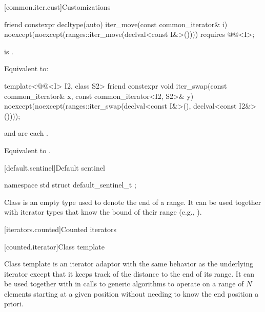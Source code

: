 [common.iter.cust]{Customizations}

%
\begin{itemdecl}
friend constexpr decltype(auto) iter_move(const common_iterator& i)
  noexcept(noexcept(ranges::iter_move(declval<const I&>())))
    requires @@<I>;
\end{itemdecl}

\begin{itemdescr}
\pnum
\hardexpects
{} is .

\pnum
\effects
Equivalent to: 
\end{itemdescr}

%
\begin{itemdecl}
template<@@<I> I2, class S2>
  friend constexpr void iter_swap(const common_iterator& x, const common_iterator<I2, S2>& y)
    noexcept(noexcept(ranges::iter_swap(declval<const I&>(), declval<const I2&>())));
\end{itemdecl}

\begin{itemdescr}
\pnum
\hardexpects
{} and 
are each .

\pnum
\effects
Equivalent to .
\end{itemdescr}

[default.sentinel]{Default sentinel}

%
\begin{itemdecl}
namespace std {
  struct default_sentinel_t { };
}
\end{itemdecl}

\pnum
Class  is an empty type used to denote the end of a
range. It can be used together with iterator types that know the bound
of their range (e.g., ).

[iterators.counted]{Counted iterators}

[counted.iterator]{Class template }

\pnum
Class template  is an iterator adaptor
with the same behavior as the underlying iterator except that
it keeps track of the distance to the end of its range.
It can be used together with 
in calls to generic algorithms to operate on
a range of $N$ elements starting at a given position
without needing to know the end position a priori.

